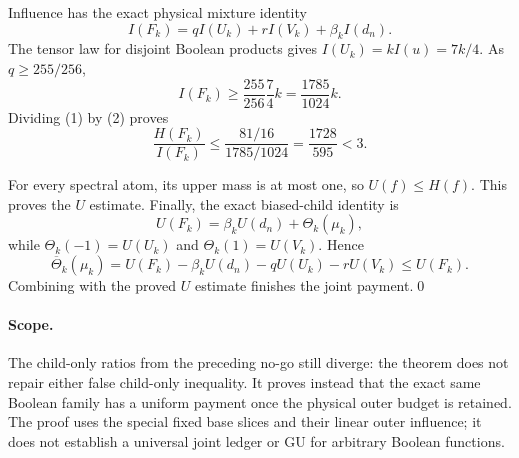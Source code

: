 Influence has the exact physical mixture identity
\[
 I(F_k)=qI(U_k)+rI(V_k)+\beta_k I(d_n).
\]
The tensor law for disjoint Boolean products gives
$I(U_k)=kI(u)=7k/4$.  As $q\ge255/256$,
\[
 I(F_k)\ge\frac{255}{256}\frac74 k
          =\frac{1785}{1024}k.                    \tag{2}
\]
Dividing (1) by (2) proves
\[
 \frac{H(F_k)}{I(F_k)}
 \le\frac{81/16}{1785/1024}
 =\frac{1728}{595}<3.
\]

For every spectral atom, its upper mass is at most one, so $U(f)\le H(f)$.
This proves the $U$ estimate.  Finally, the exact biased-child identity is
\[
 U(F_k)=\beta_kU(d_n)+\Theta_k(\mu_k),
\]
while $\Theta_k(-1)=U(U_k)$ and $\Theta_k(1)=U(V_k)$.  Hence
\[
 \overline\Theta_k(\mu_k)
 =U(F_k)-\beta_kU(d_n)-qU(U_k)-rU(V_k)
 \le U(F_k).
\]
Combining with the proved $U$ estimate finishes the joint payment.\qed

\paragraph{Scope.}
The child-only ratios from the preceding no-go still diverge: the theorem
does not repair either false child-only inequality.  It proves instead that
the exact same Boolean family has a uniform payment once the physical outer
budget is retained.  The proof uses the special fixed base slices and their
linear outer influence; it does not establish a universal joint ledger or
GU for arbitrary Boolean functions.
